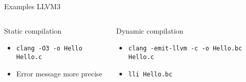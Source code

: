 %
\begin{Frame}{Examples LLVM3}
  \begin{columns}[t]
    \begin{column}{5cm} %
      \begin{block}{Static compilation}
        \begin{itemize}
        \item \texttt{clang -O3 -o Hello Hello.c}
        \item Error message more precise
        \end{itemize}
      \end{block} 
    \end{column}
    
    \begin{column}{5cm} %
      \begin{block}{Dynamic compilation}
        \begin{itemize}
        \item \texttt{clang -emit-llvm -c -o Hello.bc Hello.c}
        \item \texttt{lli Hello.bc}
        \end{itemize}
      \end{block}   
    \end{column}
  \end{columns}  
\end{Frame}


